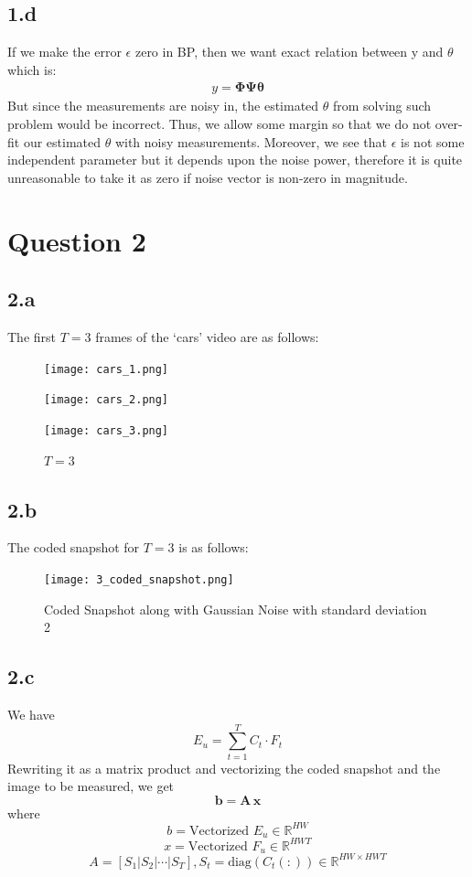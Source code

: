 \documentclass[12pt]{article}
\begin{document}
\subsection*{1.d}
If we make the error $\epsilon$ zero in BP, then we want exact relation between y and $\theta$ which is:
\begin{align*}
    y = \boldsymbol{\Phi\Psi\theta}
\end{align*}
But since the measurements are noisy in, the estimated $\theta$ from solving such problem would be incorrect. Thus, we allow some margin so that we do not over-fit our estimated $\theta$ with noisy measurements. Moreover, we see that $\epsilon$ is not some independent parameter but it depends upon the noise power, therefore it is quite unreasonable to take it as zero if noise vector is non-zero in magnitude.

\section*{Question 2}
\subsection*{2.a}
The first $T=3$ frames of the `cars' video are as follows:
\begin{figure}[ht]
	\centering
	\begin{minipage}[bt]{0.3\linewidth}
		\centering
		\texttt{[image: cars\_1.png]}
		\caption{$T = 1$}
	\end{minipage}
\begin{minipage}[bt]{0.3\linewidth}
	\centering
	\texttt{[image: cars\_2.png]}
	\caption{$T = 2$}
\end{minipage}
\begin{minipage}[bt]{0.3\linewidth}
	\centering
	\texttt{[image: cars\_3.png]}
	\caption{$T = 3$}
\end{minipage}
\end{figure}
\subsection*{2.b}
The coded snapshot for $T=3$ is as follows:
\begin{figure}[ht]
	\centering
	\texttt{[image: 3\_coded\_snapshot.png]}
	\caption{Coded Snapshot along with Gaussian Noise with standard deviation 2}
\end{figure}
\subsection*{2.c}
We have
$$E_u = \sum \limits_{t=1}^TC_t \cdot F_t$$
Rewriting it as a matrix product and vectorizing the coded snapshot and the image to be measured, we get
$$\mathbf{b =  A\, x}$$
where
$$b = \text{Vectorized } E_u \in \mathbb{R}^{HW}$$
$$x = \text{Vectorized } F_u \in \mathbb{R}^{HWT}$$
$$A = [S_1|S_2|\cdots|S_T], S_t = \text{diag}(C_t(:)) \in \mathbb{R}^{HW \times HWT}$$
\end{document}
